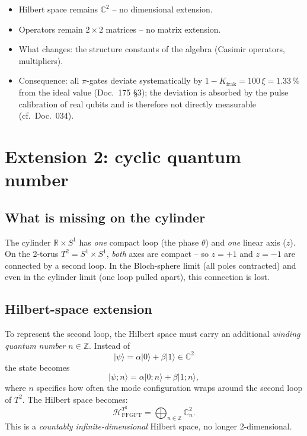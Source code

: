 \begin{itemize}[leftmargin=2em,itemsep=2pt,topsep=2pt]
  \item Hilbert space remains $\mathbb{C}^2$ -- no dimensional
        extension.
  \item Operators remain $2\times 2$ matrices -- no matrix
        extension.
  \item What changes: the structure constants of the algebra
        (Casimir operators, multipliers).
  \item Consequence: all $\pi$-gates deviate systematically by
        $1 - K_{\text{frak}} = 100\,\xi = 1.33\,\%$ from the ideal value
        (Doc.~175 §3); the deviation is absorbed by the pulse
        calibration of real qubits and is therefore not directly
        measurable (cf.\ Doc.~034).
\end{itemize}

\section{Extension 2: cyclic quantum number}

\subsection{What is missing on the cylinder}

The cylinder $\mathbb{R} \times S^1$ has \emph{one} compact loop
(the phase $\theta$) and \emph{one} linear axis ($z$). On the
2-torus $T^2 = S^1 \times S^1$, \emph{both} axes are compact -- so
$z = +1$ and $z = -1$ are connected by a second loop. In the
Bloch-sphere limit (all poles contracted) and even in the cylinder
limit (one loop pulled apart), this connection is lost.

\subsection{Hilbert-space extension}

To represent the second loop, the Hilbert space must carry an
additional \emph{winding quantum number} $n \in \mathbb{Z}$. Instead
of
\begin{equation}
  |\psi\rangle = \alpha|0\rangle + \beta|1\rangle \in \mathbb{C}^2
\end{equation}
the state becomes
\begin{equation}
  |\psi; n\rangle = \alpha|0; n\rangle + \beta|1; n\rangle,
\end{equation}
where $n$ specifies how often the mode configuration wraps around
the second loop of $T^2$. The Hilbert space becomes:
\begin{equation}
  \boxed{
    \mathcal{H}^{T^2}_{\text{FFGFT}}
    = \bigoplus_{n \in \mathbb{Z}} \mathbb{C}^2_n.
  }
\end{equation}
This is a \emph{countably infinite-dimensional} Hilbert space, no
longer 2-dimensional.

